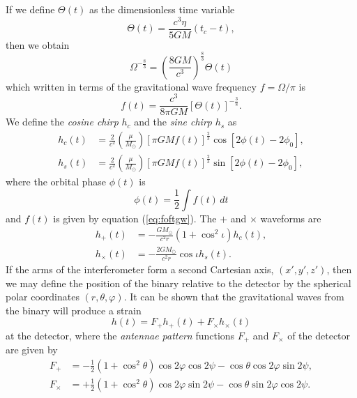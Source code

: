 If we define $\Theta(t)$ as the dimensionless time variable
\begin{equation}
\Theta(t) = \frac{c^3\eta}{5GM}(t_c - t),
\label{eq:thetadef}
\end{equation}
then we obtain
\begin{equation}
\Omega^{-\frac{8}{3}} = \left(\frac{8GM}{c^3}\right)^\frac{8}{3}
\Theta(t)
\end{equation}
which written in terms of the gravitational wave frequency $f = \Omega / \pi$
is
\begin{equation}
f(t) = \frac{c^3}{8\pi GM} \left[\Theta(t)\right]^{-\frac{3}{8}}.
\label{eq:foftgw}
\end{equation}
We define the \emph{cosine chirp} $h_c$  and the \emph{sine chirp} $h_s$ as 
\begin{align}
\label{eq:coschirp}
h_c(t) & = \frac{2}{c^2}\left(\frac{\mu}{M_\odot}\right) 
\left[\pi G M f(t)\right]^{\frac{2}{3}} 
\cos\left[2 \phi(t)  - 2\phi_0\right], \\
h_s(t) & = \frac{2}{c^2}\left(\frac{\mu}{M_\odot}\right) 
\left[\pi G M f(t)\right]^{\frac{2}{3}} 
\sin\left[2\phi(t) - 2\phi_0\right],
\label{eq:sinechirp}
\end{align}
where the orbital phase $\phi(t)$ is
\begin{equation}
\phi(t) = \frac{1}{2} \int f(t) \, dt
\end{equation}
and $f(t)$ is given by equation (\ref{eq:foftgw}). 
The $+$ and $\times$ waveforms are
\begin{align}
\label{eq:hpluswave}
h_+(t) &= - \frac{GM_\odot}{c^2 r} (1 + \cos^2\iota) h_c(t), \\
h_\times(t) &= - \frac{2GM_\odot}{c^2 r} \cos\iota h_s(t).
\end{align}
If the arms of the interferometer form a second Cartesian axis, $(x',y',z')$,
then we may define the position of the binary relative to the detector by the
spherical polar coordinates $(r,\theta,\varphi)$. It can be shown that the
gravitational waves from the binary will produce a
strain\cite{1987MNRAS.224..131S}
\begin{equation}
h(t) = F_+ h_+(t) + F_\times h_\times(t)
\end{equation}
at the detector, where the \emph{antennae pattern} functions $F_+$ and
$F_\times$ of the detector are given by
\begin{align}
F_+ &= -\frac{1}{2}(1 + \cos^2\theta) \cos 2\varphi \cos 2 \psi - 
\cos\theta \cos 2\varphi \sin 2\psi, \\
F_\times &= +\frac{1}{2}( 1 + \cos^2 \theta) \cos 2\varphi \sin 2\psi -
\cos\theta \sin 2\varphi \cos 2 \psi.
\label{eq:ftimesfunc}
\end{align}

